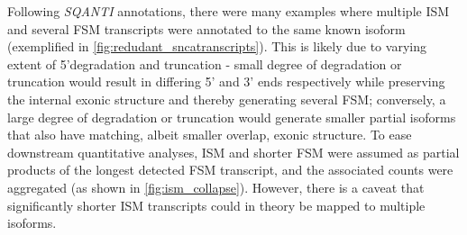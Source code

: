 Following \textit{SQANTI} annotations, there were many examples where multiple ISM and several FSM transcripts were annotated to the same known isoform (exemplified in \cref{fig:redudant_sncatranscripts}). This is likely due to varying extent of 5'degradation and truncation - small degree of degradation or truncation would result in differing 5' and 3' ends respectively while preserving the internal exonic structure and thereby generating several FSM; conversely, a large degree of degradation or truncation would generate smaller partial isoforms that also have matching, albeit smaller overlap, exonic structure. To ease downstream quantitative analyses, ISM and shorter FSM were assumed as partial products of the longest detected FSM transcript, and the associated counts were aggregated (as shown in \cref{fig:ism_collapse}). However, there is a caveat that significantly shorter ISM transcripts could in theory be mapped to multiple isoforms.  

